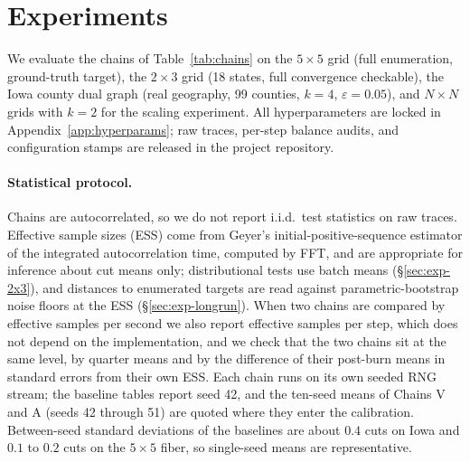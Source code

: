 \documentclass[11pt]{article}
\begin{document}
\section{Experiments}\label{sec:experiments}

We evaluate the chains of Table~\ref{tab:chains} on the
$5 \times 5$ grid (full enumeration, ground-truth target), the
$2 \times 3$ grid (18 states, full convergence checkable), the Iowa
county dual graph (real geography, 99 counties, $k = 4$,
$\varepsilon = 0.05$), and $N \times N$ grids with $k = 2$ for the
scaling experiment. All hyperparameters are locked in
Appendix~\ref{app:hyperparams}; raw traces, per-step balance audits,
and configuration stamps are released in the project repository.

\paragraph{Statistical protocol.} Chains are autocorrelated, so we do
not report i.i.d.\ test statistics on raw traces. Effective sample
sizes (ESS) come from Geyer's initial-positive-sequence estimator of
the integrated autocorrelation time, computed by FFT, and are
appropriate for inference about cut means only; distributional tests
use batch means (\S\ref{sec:exp-2x3}), and distances to enumerated
targets are read against parametric-bootstrap noise floors at the
ESS (\S\ref{sec:exp-longrun}). When two chains are compared by
effective samples per second we also report effective samples per
step, which does not depend on the implementation, and we check that
the two chains sit at the same level, by quarter means and by the
difference of their post-burn means in standard errors from their
own ESS. Each chain runs on its own seeded RNG stream; the baseline
tables report seed 42, and the ten-seed means of Chains V and A
(seeds 42 through 51) are quoted where they enter the calibration.
Between-seed standard deviations of the baselines are about $0.4$
cuts on Iowa and $0.1$ to $0.2$ cuts on the $5 \times 5$ fiber, so
single-seed means are representative.
\end{document}
